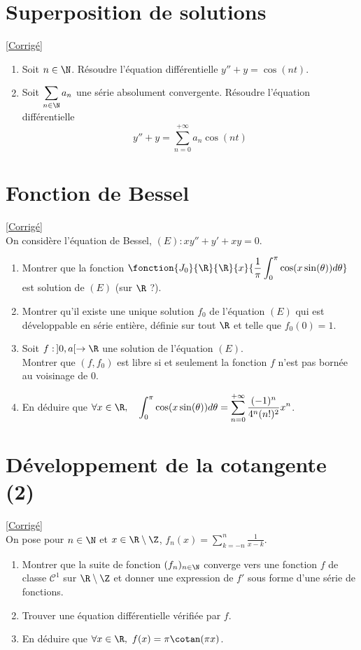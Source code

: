 \documentclass{book}
\begin{document}
\section{Superposition de solutions}
\textcolor{blue}{\hyperref[sec:superposition-de-solutions]{[Corrigé]}}\\
\label{Superposition de solutions}
\begin{enumerate}[leftmargin=*]
	\item Soit $n\in\N$. Résoudre l'équation différentielle $y''+y=\cos(nt)$.
	\item Soit $\displaystyle\sum_{n\in \N}a_n$ une série absolument convergente. Résoudre l'équation différentielle $$y''+y=\sum_{n=0}^{+\infty}a_n\cos(nt)$$
\end{enumerate}

\section{Fonction de Bessel}
\textcolor{blue}{\hyperref[sec:fonction-de-bessel]{[Corrigé]}}\\
\label{FOnction de Bessel}
On considère l'équation de Bessel, $(E):xy''+y'+xy=0$.
\begin{enumerate}
	\item Montrer que la fonction $\fonction{J_0}{\R}{\R}{x}{\displaystyle\frac{1}{\pi} \int_0^\pi \cos(x\sin(\theta)) d\theta}$ est solution de $(E)$ (sur $\R$ ?).
	\item Montrer qu'il existe une unique solution $f_0$ de l'équation $(E)$ qui est développable en série entière, définie sur tout $\R$ et telle que $f_0(0)=1$.
	\item Soit $f:\,]0,a[\to\R$ une solution de l'équation $(E)$. \\Montrer que $(f,f_0)$ est libre si et seulement la fonction $f$ n'est pas bornée au voisinage de $0$.
	\item En déduire que $\forall x\in\R, \quad \displaystyle\int_0^\pi \cos(x\sin(\theta)) d\theta=\sum_{n=0}^{+\infty}\frac{(-1)^n}{4^n(n!)^2}x^n$.
\end{enumerate}

\section{Développement de la cotangente (2)}
\textcolor{blue}{\hyperref[sec:developpement-de-la-cotangente-2]{[Corrigé]}}\\
	\label{Développement de la cotangente 2}
On pose pour $n\in \N$ et $x\in \R\setminus\Z$, $f_n(x)=\displaystyle\sum_{k=-n}^n\frac{1}{x-k}$.
\begin{enumerate}
	\item Montrer que la suite de fonction $(f_n)_{n\in \N}$ converge vers une fonction $f$ de classe $\mathcal C^1$ sur $\R\setminus\Z$ et donner une expression de $f'$ sous forme d'une série de fonctions.
	\item Trouver une équation différentielle vérifiée par $f$.
	\item En déduire que $\forall x\in \R,\ f(x)=\pi\cotan(\pi x)$.
\end{enumerate}
\end{document}
